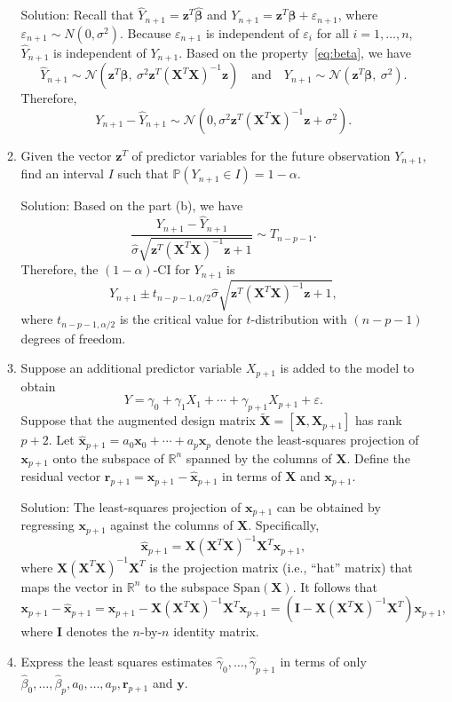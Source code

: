 \documentclass[12pt]{article}
\def\mr{\mathbf{r}}
\def\mx{\mathbf{x}}
\def\mz{\mathbf{z}}
\def\mX{\mathbf{X}}
\def\mI{\mathbf{I}}
\def\bbeta{{\boldsymbol{\beta}}}
\def\estbeta{{\boldsymbol{\hat \beta}}}
\def\mhatx{\mathbf{\hat x}}
\begin{document}
\begin{enumerate}
\begin{enumerate}
{\color{red}
Solution: Recall that $\hat Y_{n+1}=\mz^T\estbeta $ and $Y_{n+1}=\mz^T\bbeta+\varepsilon_{n+1}$, where $\varepsilon_{n+1}\sim N(0,\sigma^2)$. Because $\varepsilon_{n+1}$ is independent of $\varepsilon_{i}$ for all $i=1,\ldots,n$, $\hat Y_{n+1}$ is independent of $Y_{n+1}$. 
Based on the property~\eqref{eq:beta}, we have
\[
\hat Y_{n+1}\sim \mathcal{N}(\mz^T\bbeta,\ \sigma^2\mz^T\left(\mX^T\mX\right)^{-1}\mz)\quad \text{and}\quad Y_{n+1}\sim \mathcal{N}(\mz^T\bbeta,\ \sigma^2).
\]
Therefore,
 \[
Y_{n+1}-\hat Y_{n+1}\sim \mathcal{N}\left(0,\sigma^2 \mz^T\left(\mX^T\mX\right)^{-1}\mz+\sigma^2 \right).
\]
}
\item Given the vector $\mz^T$ of predictor variables for the future observation $Y_{n+1}$, find an interval $I$ such that $\mathbb{P}(Y_{n+1}\in I)=1-\alpha$. 
 
 {\color{red}
 Solution: Based on the part (b), we have 
 \[
 \frac{Y_{n+1}-\hat Y_{n+1}}{\hat \sigma \sqrt{\mz^T\left(\mX^T\mX\right)^{-1}\mz+1}} \sim T_{n-p-1}.
 \]
Therefore, the $(1-\alpha)$-CI for $Y_{n+1}$ is
\[
\hat Y_{n+1}\pm t_{n-p-1,\alpha/2} \hat \sigma \sqrt{\mz^T\left(\mX^T\mX\right)^{-1}\mz+1},
\] 
where $t_{n-p-1,\alpha/2}$ is the critical value for $t$-distribution with $(n-p-1)$ degrees of freedom. 
 }
 
 \item Suppose an additional predictor variable $X_{p+1}$ is added to the model to obtain
 \[
 Y=\gamma_0+\gamma_1X_1+\cdots +\gamma_{p+1}X_{p+1}+\varepsilon.
 \]
Suppose that the augmented design matrix $ \mathbf{\tilde X}=[\mX, \mX_{p+1}]$ has rank $p+2$. Let $\mhatx_{p+1}=a_0\mx_0+\cdots+a_{p}\mx_{p}$ denote the least-squares projection of $\mx_{p+1}$ onto the subspace of $\mathbb{R}^n$ spanned by the columns of $\mX$. Define the residual vector $\mathbf{r}_{p+1}=\mx_{p+1}-\mhatx_{p+1}$ in terms of $\mX$ and $\mx_{p+1}$.

{\color{red}
Solution: The least-squares projection of $\mx_{p+1}$ can be obtained by regressing $\mx_{p+1}$ against the columns of $\mX$. Specifically, 
\[
\mhatx_{p+1}= \mX(\mX^T\mX)^{-1}\mX^T\mx_{p+1},
\]
where $\mX(\mX^T\mX)^{-1}\mX^T$ is the projection matrix (i.e., ``hat'' matrix) that maps the vector in $\mathbb{R}^n$ to the subspace $\text{Span}(\mX)$. It follows that
\[
\mx_{p+1}-\mhatx_{p+1}=\mx_{p+1}-\mX(\mX^T\mX)^{-1}\mX^T\mx_{p+1}=\left(\mI-\mX(\mX^T\mX)^{-1}\mX^T\right)\mx_{p+1},
\]
where $\mI$ denotes the $n$-by-$n$ identity matrix. 
}

\item Express the least squares estimates $\hat \gamma_0,\ldots,\hat \gamma_{p+1}$ in terms of only $\hat \beta_0,\ldots,\hat \beta_p,a_0,\ldots,a_p,\mr_{p+1}$ and $\mathbf{y}$.


\end{enumerate}
\end{enumerate}
\end{document}
